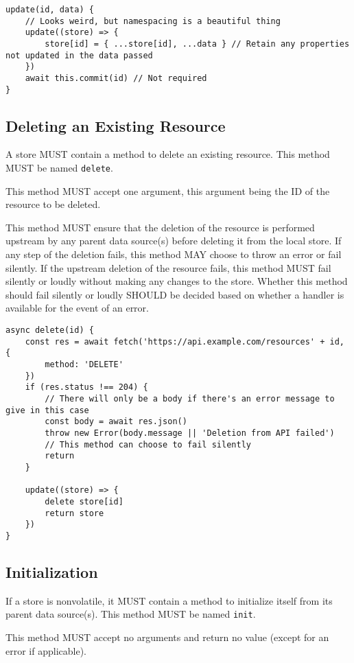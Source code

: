 \documentclass{article}
\begin{document}
\begin{lstlisting}[caption=Update Method]
update(id, data) {
    // Looks weird, but namespacing is a beautiful thing
    update((store) => {
        store[id] = { ...store[id], ...data } // Retain any properties not updated in the data passed
    })
    await this.commit(id) // Not required
}
\end{lstlisting}

\subsection{Deleting an Existing Resource}
A store MUST contain a method to delete an existing resource. This method MUST be named \verb|delete|.

This method MUST accept one argument, this argument being the ID of the resource to be deleted.

This method MUST ensure that the deletion of the resource is performed upstream by any parent data source(s) before deleting it from the local store. If any step of the deletion fails, this method MAY choose to throw an error or fail silently. If the upstream deletion of the resource fails, this method MUST fail silently or loudly without making any changes to the store. Whether this method should fail silently or loudly SHOULD be decided based on whether a handler is available for the event of an error.

\begin{lstlisting}[caption=Delete Method]
async delete(id) {
    const res = await fetch('https://api.example.com/resources' + id, {
        method: 'DELETE'
    })
    if (res.status !== 204) {
        // There will only be a body if there's an error message to give in this case
        const body = await res.json() 
        throw new Error(body.message || 'Deletion from API failed')
        // This method can choose to fail silently
        return
    }

    update((store) => {
        delete store[id]
        return store
    })
}
\end{lstlisting}

\subsection{Initialization}
If a store is nonvolatile, it MUST contain a method to initialize itself from its parent data source(s). This method MUST be named \verb|init|.

This method MUST accept no arguments and return no value (except for an error if applicable).
\end{document}
